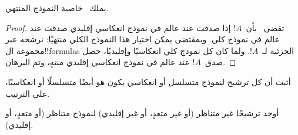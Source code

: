 \documentclass[../../../include/open-logic-section]{subfiles}
\begin{document}
\begin{cor}
  يملك~ خاصية النموذج المنتهي.
\end{cor}

\begin{proof}
  تقضي~ بأن~$!A$ إذا صدقت عند عالم
  في نموذج انعكاسي إقليدي صدقت عند عالم في نموذج كلي. وبمقتضى
   يمكن اختيار هذا النموذج الكلي منتهيًا: نرشحه
  عبر مجموعة ال!!{formula}s الجزئية لـ~$!A$. ولما كان كل نموذج كلي
  انعكاسيًا وإقليديًا، حصل صدق~$!A$ عند عالم في نموذج انعكاسي إقليدي
  منتهٍ، وتم البرهان.
\end{proof}

\begin{prob}
  أثبت أن كل ترشيح لنموذج متسلسل أو انعكاسي يكون هو أيضًا متسلسلًا أو
  انعكاسيًا، على الترتيب.
\end{prob}

\begin{prob}
  أوجد ترشيحًا غير متناظر (أو غير متعدٍ، أو غير إقليدي) لنموذج متناظر
  (أو متعدٍ، أو إقليدي).
\end{prob}
\end{document}
